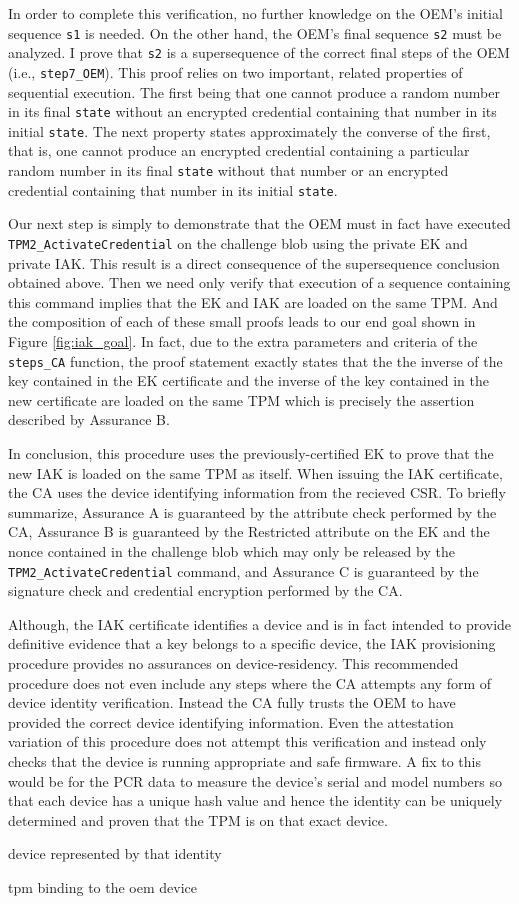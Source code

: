 In order to complete this verification, no further knowledge on the OEM's initial sequence \verb|s1| is needed.
On the other hand, the OEM's final sequence \verb|s2| must be analyzed.
I prove that \verb|s2| is a supersequence of the correct final steps of the OEM (i.e., \verb|step7_OEM|). This proof relies on two important, related properties of sequential execution. The first being that one cannot produce a random number in its final \verb|state| without an encrypted credential containing that number in its initial \verb|state|. The next property states approximately the converse of the first, that is, one cannot produce an encrypted credential containing a particular random number in its final \verb|state| without that number or an encrypted credential containing that number in its initial \verb|state|.

Our next step is simply to demonstrate that the OEM must in fact have executed \verb|TPM2_ActivateCredential| on the challenge blob using the private EK and private IAK. This result is a direct consequence of the supersequence conclusion obtained above. Then we need only verify that execution of a sequence containing this command implies that the EK and IAK are loaded on the same TPM. And the composition of each of these small proofs leads to our end goal shown in Figure 
\ref{fig:iak_goal}.
In fact, due to the extra parameters and criteria of the
\verb|steps_CA| function, the proof statement exactly states that the the inverse of the key contained in
the EK certificate and the inverse of the key contained in the new certificate are loaded on the
same TPM which is precisely the assertion described by Assurance B.

In conclusion, this procedure uses the previously-certified EK to prove that the new IAK is
loaded on the same TPM as itself. When issuing the IAK certificate, the CA uses the device identifying information from the recieved CSR. 
To briefly summarize, Assurance A
is guaranteed by the attribute check performed by the CA, Assurance B is guaranteed by the
Restricted attribute on the EK and the nonce contained in the challenge blob which may only be
released by the \verb|TPM2_ActivateCredential| command, and Assurance C is guaranteed by the signature check and credential encryption performed by the CA.

Although, the IAK certificate identifies a device and is in fact intended to provide definitive evidence that a key belongs to a specific device, the IAK provisioning procedure provides no assurances on device-residency. This recommended procedure does not even include any steps where the CA attempts any form of device identity verification.  Instead the CA fully trusts the OEM to have provided the correct device identifying information. Even the attestation variation of this procedure does not attempt this verification and instead only checks that the device is running appropriate and safe firmware. A fix to this would be for the PCR data to measure the device's serial and model numbers so that each device has a unique hash value and hence the identity can be uniquely determined and proven that the TPM is on that exact device. 

device represented by that identity

tpm binding to the oem device


